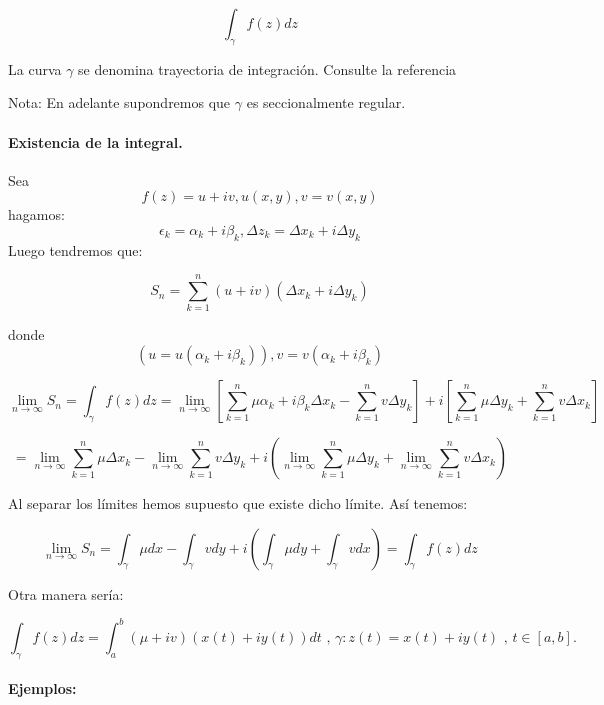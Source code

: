 \documentclass[a4paper,12pt]{article}
\begin{document}
\[
\int_{\gamma} f(z) dz
\]

La curva \(\gamma\) se denomina trayectoria de integración. Consulte la referencia \cite{Bernal2010}

Nota: En adelante supondremos que \(\gamma\) es seccionalmente regular.



\paragraph{Existencia de la integral.}

Sea \[f(z)=u + iv , u(x,y), v=v(x,y)\] hagamos: \[\epsilon_k = \alpha_k + i\beta_k, \Delta z_k = \Delta x_k + i \Delta y_k\] Luego tendremos que:

\[
S_n = \sum_{k=1}^n (u + iv) (\Delta x_k + i \Delta y_k)
\]

donde \[(u=u(\alpha_k + i\beta_k)), v=v(\alpha_k + i\beta_k)\]

\[
\lim_{n \to \infty} S_n = \int_{\gamma} f(z) dz = \lim_{n \to \infty} \left[ \sum_{k=1}^n \mu\alpha_k + i\beta_k \Delta x_k - \sum_{k=1}^n v \Delta y_k \right] + i \left[ \sum_{k=1}^n \mu \Delta y_k + \sum_{k=1}^n v \Delta x_k \right]
\]

\[
= \lim_{n \to \infty} \sum_{k=1}^n \mu \Delta x_k - \lim_{n \to \infty} \sum_{k=1}^n v \Delta y_k + i \left( \lim_{n \to \infty} \sum_{k=1}^n \mu \Delta y_k + \lim_{n \to \infty} \sum_{k=1}^n v \Delta x_k \right)
\]

Al separar los límites hemos supuesto que existe dicho límite. Así tenemos:

\[
\lim_{n \to \infty} S_n = \int_{\gamma} \mu dx - \int_{\gamma} v dy + i \left( \int_{\gamma} \mu dy + \int_{\gamma} v dx \right) = \int_{\gamma} f(z) dz
\]

Otra manera sería:

\[
\int_{\gamma} f(z) dz = \int_a^b (\mu + iv)(x(t) + iy(t)) dt \text{ , } \gamma: z(t)=x(t)+iy(t) \text{ , } t \in [a,b].
\]

\paragraph{Ejemplos:}
\end{document}
